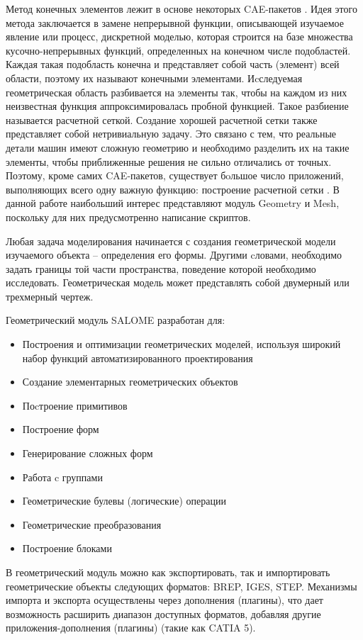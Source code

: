 \documentclass[a4paper,12pt]{article}
\theoremstyle{plain} %
\theoremstyle{definition} %
\theoremstyle{remark} %
\begin{document}
	 Метод конечных элементов лежит в основе некоторых CAE-пакетов . Идея этого метода заключается в замене непрерывной функции, описывающей изучаемое явление или процесс, дискретной моделью, которая строится на базе множества кусочно-непрерывных функций, определенных на конечном числе подобластей. Каждая такая подобласть конечна и представляет собой часть (элемент) всей области, поэтому их называют конечными элементами. Иcследуемая геометрическая область разбивается на элементы так, чтобы на каждом из них неизвестная функция аппроксимировалась пробной функцией. Такое разбиение называется расчетной сеткой. Создание хорошей расчетной сетки также представляет собой нетривиальную задачу. Это связано с тем, что реальные детали машин имеют сложную геометрию и необходимо разделить их на такие элементы, чтобы приближенные решения не сильно отличались от точных. Поэтому, кроме самих CAE-пакетов, существует бoльшое число приложений, выполняющих всего одну важную функцию: построение расчетной сетки \cite{wIbmSalome}. В данной работе наибольший интерес представляют модуль Geometry и Mesh, поскольку для них предусмотренно написание скриптов.
	
	Любая задача моделирования начинается с создания геометрической модели изучаемого объекта – определения его формы. Другими cловами, необходимо задать границы той части пространства, поведение которой необходимо исследовать. Геометрическая модель может представлять собой двумерный или трехмерный чертеж.
		
	Геометрический модуль SALOME разработан для:
	\begin{itemize}
		\item Построения и оптимизации геометрических моделей, используя широкий набор функций автоматизированного проектирования
		\item Создание элементарных геометрических объектов
		\item Поcтроение примитивов
		\item Построение форм
		\item Генерирование сложных форм
		\item Работа c группами
		\item Геометрические булевы (логические) операции
		\item Геометрические преобразования
		\item Построение блоками
	\end{itemize}
	
	В геометрический модуль можно как экспортировать, так и импортировать геометрические объекты следующих форматов: BREP, IGES, STEP. Механизмы импорта и экспорта осуществлены через дополнения (плагины), что дает возможность расширить диапазон доступных форматов, добавляя другие приложения-дополнения (плагины) (такие как CATIA 5)\cite{wLadugaGeom}.
	
\end{document}
